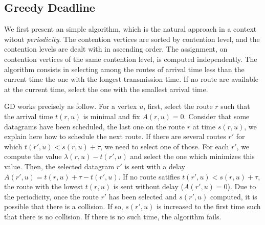 \subsection{Greedy Deadline}

We first present an simple algorithm, which is the natural approach in a context witout \emph{periodicity}.
The contention vertices are sorted by contention level, and the contention levels are dealt with in ascending order. The assignment, on contention vertices of the same contention level, is computed independently. The \greedydeadline algorithm consists in selecting among the routes of arrival time less than the current time the one with the longest transmission time. If no route are available at the current time, select the one with the smallest arrival time.

GD works precisely as follow. For a vertex $u$, first, select the route $r$ such that the arrival time $t(r,u)$ is minimal and fix $A(r,u) = 0$. Consider that some datagrams have been scheduled, the last one on the route $r$ at time $s(r,u)$, we explain here how to schedule the next route.  If there are several routes $r'$ for which $t(r',u) < s(r,u) + \tau $, we need to select one of those. For each $r'$, we compute the value $\lambda(r,u) - t(r',u)$ and select the one which minimizes this value. Then, the selected datagram $r'$ is sent with a delay $A(r',u) = t(r,u) + \tau - t(r',u)$. If no route satifies $t(r',u) < s(r,u) + \tau$, the route with the lowest $t(r,u)$ is sent without delay ($A(r',u) = 0$). 
Due to the periodicity, once the route $r'$ has been selected and $s(r',u)$ computed, it is possible that there is a collision. If so, $s(r',u)$ is increased to the first time such that there is no collision. If there is no such time, the algorithm fails.


%    

